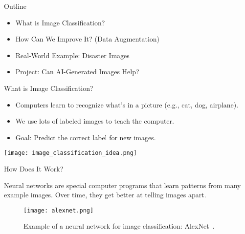 
\begin{frame}{Outline}
  \begin{itemize}
    \item What is Image Classification?
    \item How Can We Improve It? (Data Augmentation)
    \item Real-World Example: Disaster Images
    \item Project: Can AI-Generated Images Help?
  \end{itemize}
\end{frame}



\begin{frame}{What is Image Classification?}
  \begin{itemize}
    \item Computers learn to recognize what’s in a picture (e.g., cat, dog, airplane).
    \item We use lots of labeled images to teach the computer.
    \item Goal: Predict the correct label for new images.
  \end{itemize}
  \centering
  \texttt{[image: image\_classification\_idea.png]}
\end{frame}

\begin{refsection}
\begin{frame}{How Does It Work?}
  \begin{flushleft}
  Neural networks are special computer programs that learn patterns from many example images. Over time, they get better at telling images apart.
  \end{flushleft}
  \centering
  \begin{figure}
    \centering
    \texttt{[image: alexnet.png]}
    \caption[]{\scriptsize Example of a neural network for image classification: AlexNet~\parencite{krizhevskyImageNetClassificationDeep2012}.}
  \end{figure}
  \bottomleftrefs
\end{frame}
\end{refsection}




